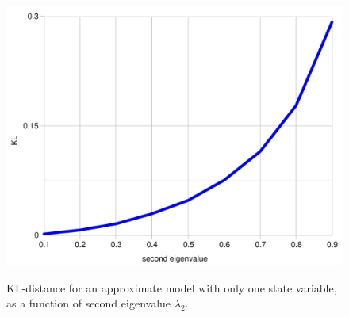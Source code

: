 \documentclass[10pt,letterpaper]{article}
\begin{document}
 \begin{figure}[h]  \begin{center}
 \label{kl-eigen}
\includegraphics[scale=0.3]{kl-eigenvalue-5.pdf} \caption{KL-distance for an approximate model with only one state variable, as a function of second eigenvalue $\lambda_2$.} \end{center} 
\end{figure}
\end{document}
